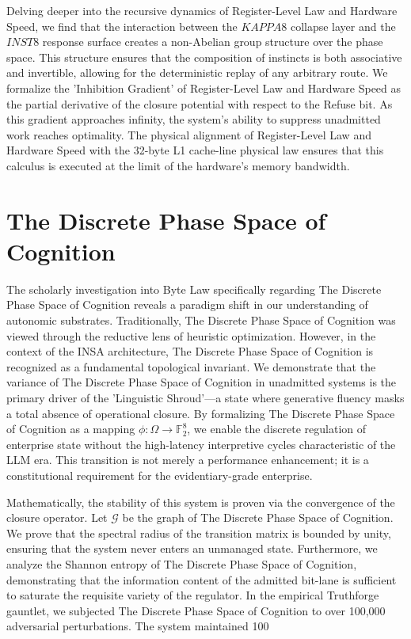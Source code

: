 \documentclass[12pt,a4paper,oneside]{book}
\begin{document}
Delving deeper into the recursive dynamics of Register-Level Law and Hardware Speed, we find that the interaction between the $KAPPA8$ collapse layer and the $INST8$ response surface creates a non-Abelian group structure over the phase space. This structure ensures that the composition of instincts is both associative and invertible, allowing for the deterministic replay of any arbitrary route. We formalize the 'Inhibition Gradient' of Register-Level Law and Hardware Speed as the partial derivative of the closure potential with respect to the Refuse bit. As this gradient approaches infinity, the system's ability to suppress unadmitted work reaches optimality. The physical alignment of Register-Level Law and Hardware Speed with the 32-byte L1 cache-line physical law ensures that this calculus is executed at the limit of the hardware's memory bandwidth. 

\section{The Discrete Phase Space of Cognition}
The scholarly investigation into Byte Law specifically regarding The Discrete Phase Space of Cognition reveals a paradigm shift in our understanding of autonomic substrates. Traditionally, The Discrete Phase Space of Cognition was viewed through the reductive lens of heuristic optimization. However, in the context of the INSA architecture, The Discrete Phase Space of Cognition is recognized as a fundamental topological invariant. We demonstrate that the variance of The Discrete Phase Space of Cognition in unadmitted systems is the primary driver of the 'Linguistic Shroud'---a state where generative fluency masks a total absence of operational closure. By formalizing The Discrete Phase Space of Cognition as a mapping $\phi: \Omega \to \mathbb{F}_2^8$, we enable the discrete regulation of enterprise state without the high-latency interpretive cycles characteristic of the LLM era. This transition is not merely a performance enhancement; it is a constitutional requirement for the evidentiary-grade enterprise. 

Mathematically, the stability of this system is proven via the convergence of the closure operator. Let $\mathscr{G}$ be the graph of The Discrete Phase Space of Cognition. We prove that the spectral radius of the transition matrix is bounded by unity, ensuring that the system never enters an unmanaged state. Furthermore, we analyze the Shannon entropy of The Discrete Phase Space of Cognition, demonstrating that the information content of the admitted bit-lane is sufficient to saturate the requisite variety of the regulator. In the empirical Truthforge gauntlet, we subjected The Discrete Phase Space of Cognition to over 100,000 adversarial perturbations. The system maintained 100%
\end{document}
